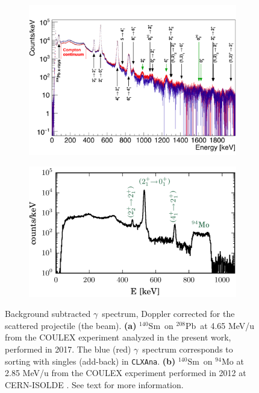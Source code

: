 \documentclass[twoside,english]{uiofysmaster/uiofysmaster}
\newcommand{\blank}[1]{\hspace*{#1}} %
\newcommand{\Sm}{$^{140}$Sm} %
\newcommand{\Pb}{$^{208}$Pb}
\newcommand{\ga}{$\gamma$}
\begin{document}
\begin{figure}[h!t]
	\centering
	\begin{subfigure}[t]{\textwidth}
		\centering
		\includegraphics[width=\textwidth]{../Plots/plotting/gam_dcB_s_and_a.png}
		\caption{}
		\label{fig:gam_dcB}
	\end{subfigure}
	\begin{subfigure}[t]{0.8\textwidth}
		\includegraphics[width=\textwidth]{Images/gam_MK.png}
		\caption{}
		\label{fig:gam_MK}
	\end{subfigure}
	\caption{Background subtracted \ga\ spectrum, Doppler corrected for the scattered projectile (the beam).
		\textbf{(a)} \Sm\ on \Pb\ at 4.65 MeV/u from the COULEX experiment analyzed in the present work, performed in 2017.
	 	The blue (red) \ga\ spectrum corresponds to sorting with singles (add-back) in \texttt{CLXAna}.
		\textbf{(b)} \Sm\ on $^{94}$Mo at 2.85 MeV/u from the COULEX experiment performed in 2012 at CERN-ISOLDE \cite{Klintefjord}. 
		See text for more information. 	
	 	}
	\label{fig:gam_compared}
\end{figure}
\end{document}
